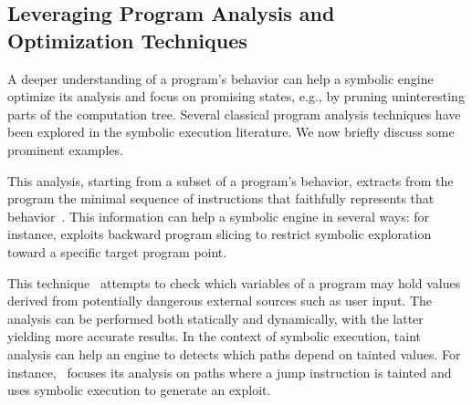 
\subsection{Leveraging Program Analysis and Optimization Techniques}
\label{ss:program-analysis}

A deeper understanding of a program's behavior can help a symbolic engine optimize its analysis and focus on promising states, e.g., by pruning uninteresting parts of the computation tree. Several classical program analysis techniques have been explored in the symbolic execution literature. We now briefly discuss some prominent examples.


 This analysis, starting from a subset of a program's behavior, extracts from the program the minimal sequence of instructions that faithfully represents that behavior~\cite{Weiser84}. This information can help a symbolic engine in several ways: for instance, \cite{FIRMALICE-NDSS15} exploits backward program slicing to restrict symbolic exploration toward a specific target program point.


 This technique~\cite{SAB-SP10} attempts to check which variables of a program may hold values derived from potentially dangerous external sources such as user input. The analysis can be performed both statically and dynamically, with the latter yielding more accurate results. In the context of symbolic execution, taint analysis can help an engine to detects which paths depend on tainted values. For instance,~\cite{MAYHEM-SP12} focuses its analysis on paths where a jump instruction is tainted and uses symbolic execution to generate an exploit.

